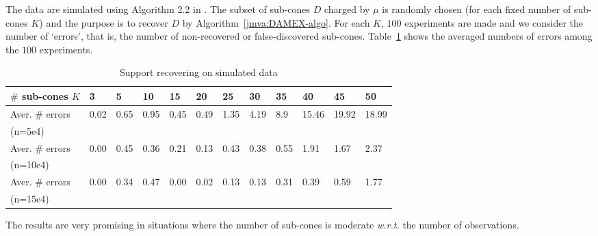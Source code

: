 The data are simulated using  Algorithm 2.2 in \cite{Stephenson2003}.
The subset of sub-cones $D$ charged by $\mu$ is randomly chosen (for each
fixed number of sub-cones $K$) and the purpose is to recover $D$ by Algorithm~\ref{jmva:DAMEX-algo}.
  For each $K$, $100$ experiments
are made and we consider  the  number of `errors', that is,      the number of
non-recovered or false-discovered sub-cones. Table~\ref{jmva:table:logevd} shows the averaged
numbers of errors  among the $100$ experiments. %
\begin{table}[!ht]
\centering
\scriptsize
\begin{tabular}{|l|lllllllllll|}
  \hline
  $\#$ sub-cones $K$       &    3 & 5    &  10   & 15   & 20    & 25  & 30   & 35    & 40    & 45    & 50 \\
  \hline
 Aver. $\#$ errors     & 0.02 & 0.65 & 0.95  & 0.45 & 0.49  & 1.35& 4.19 & 8.9  & 15.46  & 19.92  & 18.99 \\
   (n=5e4)     &&&&&&&&&&& \\
\hline
 Aver. $\#$ errors     & 0.00 & 0.45 & 0.36  & 0.21 & 0.13  & 0.43& 0.38 & 0.55  & 1.91  & 1.67  & 2.37 \\
   (n=10e4)     &&&&&&&&&&& \\

  \hline
 Aver. $\#$ errors     & 0.00  & 0.34 & 0.47 & 0.00 & 0.02  & 0.13& 0.13 & 0.31  & 0.39  & 0.59  & 1.77 \\
(n=15e4) &&&&&&&&&&& \\
  \hline
\end{tabular}
\caption{Support recovering on simulated data}
\label{jmva:table:logevd}
\end{table}
The results are very promising in situations where the number of sub-cones is moderate \emph{w.r.t.} the number of observations. %

